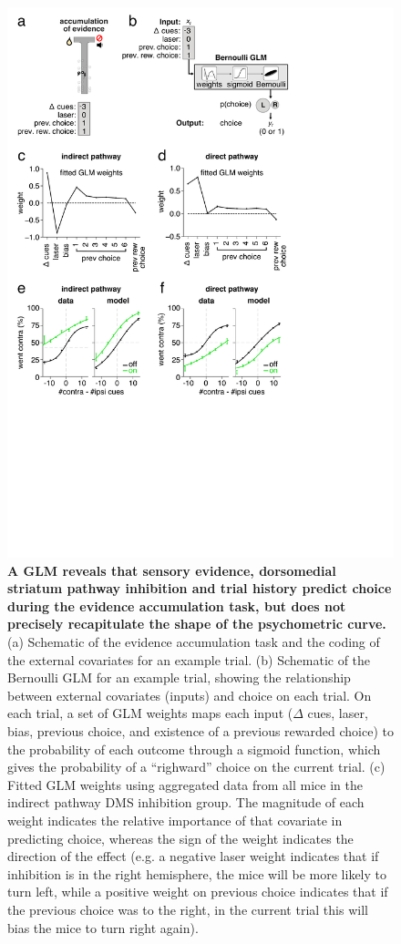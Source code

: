 \begin{figure}[t!]
  \begin{center}
    \includegraphics[width=0.70\linewidth]{ch2-glmhmm/glmhmm-figures/Fig4.pdf}
    \caption[A GLM reveals that sensory evidence, dorsomedial striatum pathway inhibition and trial history predict choice during the evidence accumulation task, but does not precisely recapitulate the shape of the psychometric curve.]{\textbf{A GLM reveals that sensory evidence, dorsomedial striatum pathway inhibition and trial history predict choice during the evidence accumulation task, but does not precisely recapitulate the shape of the psychometric curve.} (a) Schematic of the evidence accumulation task and the coding of the external covariates for an example trial.  (b) Schematic of the Bernoulli GLM for an example trial, showing the relationship between external covariates (inputs) and choice on each trial. On each trial, a set of GLM weights maps each input ($\Delta$ cues, laser, bias, previous choice, and existence of a previous rewarded choice) to the probability of each outcome through a sigmoid function, which gives the probability of a “righward” choice on the current trial. (c) Fitted GLM weights using aggregated data from all mice in the indirect pathway DMS inhibition group. The magnitude of each weight indicates the relative importance of that covariate in predicting choice, whereas the sign of the weight indicates the direction of the effect (e.g. a negative laser weight indicates that if inhibition is in the right hemisphere, the mice will be more likely to turn left, while a positive weight on previous choice indicates that if the previous choice was to the right, in the current trial this will bias the mice to turn right again). }
    \label{fig:glmhmm:4}
  \end{center}
  \vspace{-1.5cm}
\end{figure}
